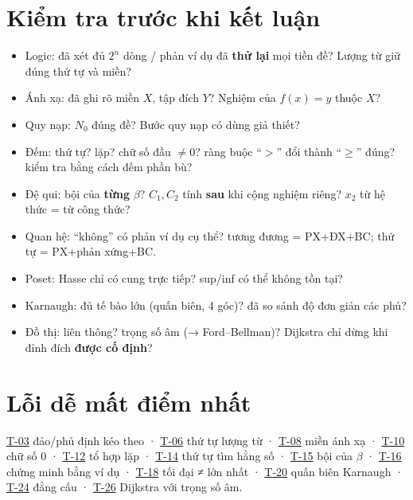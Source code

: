 \documentclass[
  10pt,
  twoside,openany]{book}
\providecommand{\tightlist}{%
  \setlength{\itemsep}{0pt}\setlength{\parskip}{0pt}}
\begin{document}
\hypertarget{kiux1ec3m-tra-trux1b0ux1edbc-khi-kux1ebft-luux1eadn}{%
\section{Kiểm tra trước khi kết
luận}\label{kiux1ec3m-tra-trux1b0ux1edbc-khi-kux1ebft-luux1eadn}}

\begin{itemize}
\tightlist
\item
  Logic: đã xét đủ \(2^n\) dòng / phản ví dụ đã \textbf{thử lại} mọi
  tiền đề? Lượng từ giữ đúng thứ tự và miền?
\item
  Ánh xạ: đã ghi rõ miền \(X\), tập đích \(Y\)? Nghiệm của \(f(x)=y\)
  thuộc \(X\)?
\item
  Quy nạp: \(N_0\) đúng đề? Bước quy nạp có dùng giả thiết?
\item
  Đếm: thứ tự? lặp? chữ số đầu \(\ne0\)? ràng buộc ``\(>\)'' đổi thành
  ``\(\ge\)'' đúng? kiểm tra bằng cách đếm phần bù?
\item
  Đệ qui: bội của \textbf{từng} \(\beta\)? \(C_1,C_2\) tính \textbf{sau}
  khi cộng nghiệm riêng? \(x_2\) từ hệ thức = từ công thức?
\item
  Quan hệ: ``không'' có phản ví dụ cụ thể? tương đương = PX+ĐX+BC; thứ
  tự = PX+phản xứng+BC.
\item
  Poset: Hasse chỉ có cung trực tiếp? sup/inf có thể không tồn tại?
\item
  Karnaugh: đủ tế bào lớn (quấn biên, 4 góc)? đã so sánh độ đơn giản các
  phủ?
\item
  Đồ thị: liên thông? trọng số âm (→ Ford--Bellman)? Dijkstra chỉ dừng
  khi đỉnh đích \textbf{được cố định}?
\end{itemize}

\hypertarget{lux1ed7i-dux1ec5-mux1ea5t-ux111iux1ec3m-nhux1ea5t}{%
\section{Lỗi dễ mất điểm
nhất}\label{lux1ed7i-dux1ec5-mux1ea5t-ux111iux1ec3m-nhux1ea5t}}

\protect\hyperlink{T-03}{T-03} đảo/phủ định kéo theo ·
\protect\hyperlink{T-06}{T-06} thứ tự lượng từ ·
\protect\hyperlink{T-08}{T-08} miền ánh xạ ·
\protect\hyperlink{T-10}{T-10} chữ số 0 · \protect\hyperlink{T-12}{T-12}
tổ hợp lặp · \protect\hyperlink{T-14}{T-14} thứ tự tìm hằng số ·
\protect\hyperlink{T-15}{T-15} bội của \(\beta\) ·
\protect\hyperlink{T-16}{T-16} chứng minh bằng ví dụ ·
\protect\hyperlink{T-18}{T-18} tối đại ≠ lớn nhất ·
\protect\hyperlink{T-20}{T-20} quấn biên Karnaugh ·
\protect\hyperlink{T-24}{T-24} đẳng cấu · \protect\hyperlink{T-26}{T-26}
Dijkstra với trọng số âm.
\end{document}
